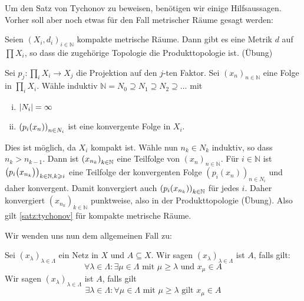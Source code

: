 Um den Satz von Tychonov zu beweisen, benötigen wir einige Hilfsaussagen.
Vorher soll aber noch etwas für den Fall metrischer Räume gesagt werden:

\begin{beispiel}[{name=[Tychonov für metrische Räume]}]
	Seien $(X_i, d_i)_{i \in \mathbb{N}}$ kompakte metrische Räume. 
	Dann gibt es eine Metrik $d$ auf $\prod X_i$, so dass die zugehörige Topologie die Produkttopologie ist.
	(Übung)
\end{beispiel}
\begin{beweis}[{name={Tychonov in metrischen Räumen}}]
	Sei $p_j \colon \prod_i X_i \to X_j$ die Projektion auf den $j$-ten Faktor. 
	Sei $(x_n)_{n \in \mathbb{N}}$ eine Folge in $\prod_i X_i$. 
	Wähle induktiv $\mathbb{N}= N_0 \supseteq N_1 \supseteq N_2 \supseteq \ldots $ mit 
	\begin{enumerate}[(i)]
		\item $\abs*{N_i} = \infty $
		\item $\enbrace*{p_i(x_n)}_{n \in N_i} $ ist eine konvergente Folge in $X_i$.
	\end{enumerate}
	Dies ist möglich, da $X_i$ kompakt ist.
	Wähle nun $n_k \in N_k$ induktiv, so dass $n_k > n_{k-1}$. 
	Dann ist $\enbrace*{x_{n_k}}_{k \in \mathbb{N}} $ eine Teilfolge von $(x_n)_{n \in \mathbb{N}}$. 
	Für $i \in \mathbb{N}$ ist $\enbrace*{p_i\enbrace[\big]{x_{n_k}}}_{k \in \mathbb{N}, k \ge i}$ eine Teilfolge der konvergenten Folge $(p_i(x_n))_{n \in N_i}$ und daher konvergent. 
	Damit konvergiert auch $\enbrace*{p_i \enbrace*{x_{n_k}} }_{k \in \mathbb{N}} $ für jedes $i$. 
	Daher konvergiert $(x_{n_k})_{k \in \mathbb{N}}$ punktweise, also in der Produkttopologie (Übung).
	Also gilt \cref{satz:tychonov} für kompakte metrische Räume.
\end{beweis}

Wir wenden uns nun dem allgemeinen Fall zu:
\begin{definition}[{name=[Netze immer wieder und schließlich in $A$]}]
	Sei $(x_\lambda)_{\lambda  \in \Lambda}$ ein Netz in $X$ und $A \subseteq X$. 
	Wir sagen $(x_\lambda )_{\lambda \in \Lambda}$ ist  $A$, falls gilt:
	\[
		\forall \lambda \in \Lambda : \exists \mu \in \Lambda \text{ mit } \mu \ge \lambda \text{ und } x_\mu \in A
	\]  
	Wir sagen $(x_\lambda )_{\lambda \in \Lambda}$ ist  $A$, falls gilt 
	\[
		\exists \lambda  \in \Lambda : \forall \mu \in \Lambda \text{ mit } \mu \ge \lambda \text{ gilt } x_\mu \in A
	\]
\end{definition}

